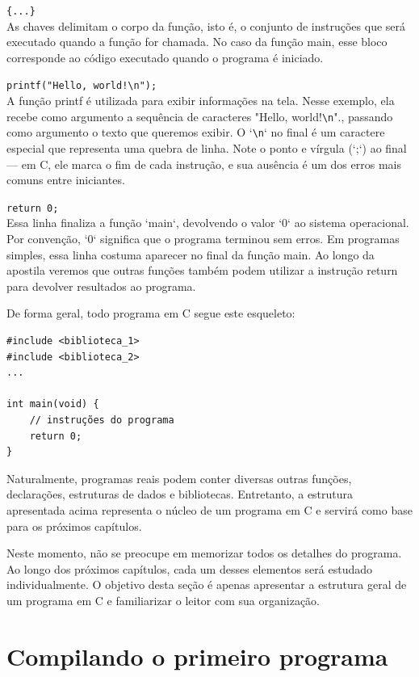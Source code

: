 \documentclass[12pt,a4paper,oneside]{extreport}
\begin{document}
\texttt{\{...\}} \\
As chaves delimitam o corpo da função, isto é, o conjunto de instruções que será executado quando a função for chamada. No caso da função main, esse bloco corresponde ao código executado quando o programa é iniciado.

\texttt{printf("Hello, world!\textbackslash n");} \\
A função printf é utilizada para exibir informações na tela. Nesse exemplo, ela recebe como argumento a sequência de caracteres "Hello, world!\verb|\n|"., passando como argumento o texto que queremos exibir. O `\verb|\n|` no final é um caractere especial que representa uma quebra de linha. Note o ponto e vírgula (`;`) ao final — em C, ele marca o fim de cada instrução, e sua ausência é um dos erros mais comuns entre iniciantes.

\texttt{return 0;} \\
Essa linha finaliza a função `main`, devolvendo o valor `0` ao sistema operacional. Por convenção, `0` significa que o programa terminou sem erros. Em programas simples, essa linha costuma aparecer no final da função main. Ao longo da apostila veremos que outras funções também podem utilizar a instrução return para devolver resultados ao programa.

De forma geral, todo programa em C segue este esqueleto:

\begin{lstlisting}
#include <biblioteca_1>
#include <biblioteca_2>
...

int main(void) {
    // instruções do programa
    return 0;
}
\end{lstlisting}

Naturalmente, programas reais podem conter diversas outras funções, declarações, estruturas de dados e bibliotecas. Entretanto, a estrutura apresentada acima representa o núcleo de um programa em C e servirá como base para os próximos capítulos.

\begin{tcolorbox}[title=Observação]

Neste momento, não se preocupe em memorizar todos os detalhes do programa.
Ao longo dos próximos capítulos, cada um desses elementos será estudado
individualmente. O objetivo desta seção é apenas apresentar a estrutura geral
de um programa em C e familiarizar o leitor com sua organização.

\end{tcolorbox}


\section{Compilando o primeiro programa}
\end{document}
